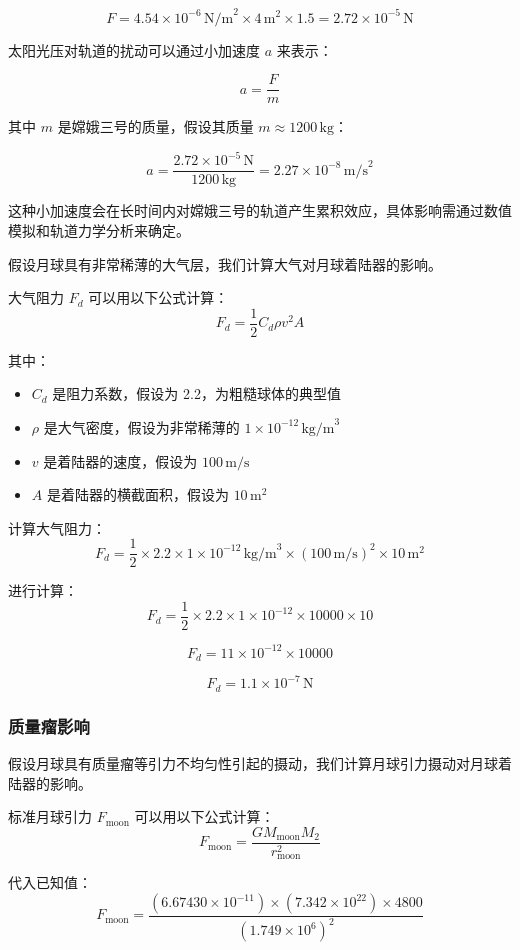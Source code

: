 \documentclass{ctexart}
\begin{document}
\[
F = 4.54 \times 10^{-6} \, \text{N/m}^2 \times 4 \, \text{m}^2 \times 1.5 = 2.72 \times 10^{-5} \, \text{N}
\]


太阳光压对轨道的扰动可以通过小加速度 \( a \) 来表示：

\[
a = \frac{F}{m}
\]

其中 \( m \) 是嫦娥三号的质量，假设其质量 \( m \approx 1200 \, \text{kg} \)：

\[
a = \frac{2.72 \times 10^{-5} \, \text{N}}{1200 \, \text{kg}} = 2.27 \times 10^{-8} \, \text{m/s}^2
\]

这种小加速度会在长时间内对嫦娥三号的轨道产生累积效应，具体影响需通过数值模拟和轨道力学分析来确定。

假设月球具有非常稀薄的大气层，我们计算大气对月球着陆器的影响。

大气阻力 \( F_d \) 可以用以下公式计算：
\[
F_d = \frac{1}{2} C_d \rho v^2 A
\]

其中：
\begin{itemize}
	\renewcommand\labelitemi{} %
    \item \( C_d \) 是阻力系数，假设为 2.2，为粗糙球体的典型值
    \item \( \rho \) 是大气密度，假设为非常稀薄的 \( 1 \times 10^{-12} \, \text{kg/m}^3 \)
    \item \( v \) 是着陆器的速度，假设为 \( 100 \, \text{m/s} \)
    \item \( A \) 是着陆器的横截面积，假设为 \( 10 \, \text{m}^2 \)
\end{itemize}

计算大气阻力：
\[
F_d = \frac{1}{2} \times 2.2 \times 1 \times 10^{-12} \, \text{kg/m}^3 \times (100 \, \text{m/s})^2 \times 10 \, \text{m}^2
\]

进行计算：
\[
F_d = \frac{1}{2} \times 2.2 \times 1 \times 10^{-12} \times 10000 \times 10
\]

\[
F_d = 11 \times 10^{-12} \times 10000
\]

\[
F_d = 1.1 \times 10^{-7} \, \text{N}
\]

\subsubsection{质量瘤影响}
假设月球具有质量瘤等引力不均匀性引起的摄动，我们计算月球引力摄动对月球着陆器的影响。

标准月球引力 \( F_{\text{moon}} \) 可以用以下公式计算：
\[
F_{\text{moon}} = \frac{G M_{\text{moon}} M_2}{r_{\text{moon}}^2}
\]

代入已知值：
\[
F_{\text{moon}} = \frac{(6.67430 \times 10^{-11}) \times (7.342 \times 10^{22}) \times 4800}{(1.749 \times 10^6)^2}
\]
\end{document}

